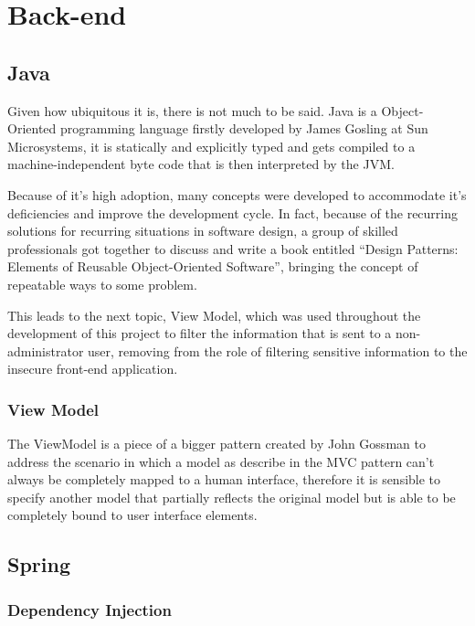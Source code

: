 
\section{Back-end}
\label{cha:concepts:sec:backend}

\subsection{Java}
Given how ubiquitous it is, there is not much to be said. Java is a Object-Oriented programming language firstly developed by James Gosling at Sun Microsystems, it is statically and explicitly typed and gets compiled to a machine-independent byte code that is then interpreted by the \gls{JVM}\cite{java}.

Because of it's high adoption, many concepts were developed to accommodate it's deficiencies and improve the development cycle. In fact, because of the recurring solutions for recurring situations in software design, a group of skilled professionals got together to discuss and write a book entitled ``Design Patterns: Elements of Reusable Object-Oriented Software''\cite{patterns}, bringing the concept of repeatable ways to some problem.

This leads to the next topic, View Model, which was used throughout the development of this project to filter the information that is sent to a non-administrator user, removing from the role of filtering sensitive information to the insecure front-end application.

\subsubsection{View Model}
The ViewModel is a piece of a bigger pattern created by John Gossman to address the scenario in which a model as describe in the MVC pattern can't always be completely mapped to a human interface\cite{viewmodel}, therefore it is sensible to specify another model that partially reflects the original model but is able to be completely bound to user interface elements.

\subsection{Spring}
\subsubsection{Dependency Injection}
